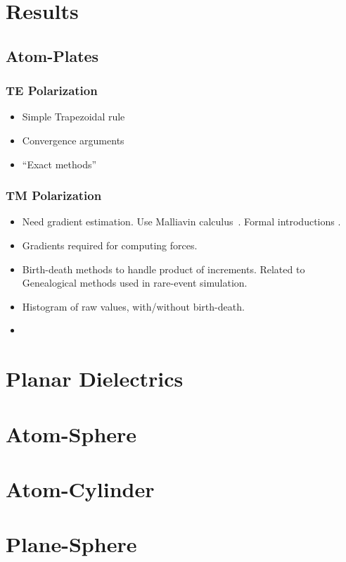 \section{Results}
    \subsection{Atom-Plates}
    
    \subsubsection{TE Polarization}
    \begin{itemize}
      \item Simple Trapezoidal rule
      \item Convergence arguments
      \item ``Exact methods''
    \end{itemize}
    
    \subsubsection{TM Polarization}

    \begin{itemize}
      \item Need gradient estimation.  Use Malliavin calculus~\cite{Fournie1999, Chen2007,Kohatsu-Higa2003}.
        Formal introductions \cite{Nualart2006, Malliavin2006, DiNunno2009}.
      \item Gradients required for computing forces.  
      \item Birth-death methods to handle product of increments.  Related to Genealogical 
        methods used in rare-event simulation.  
      \item Histogram of raw values, with/without birth-death.
      \item 
    \end{itemize}
    
    \section{Planar Dielectrics}




    \section{Atom-Sphere}
    \section{Atom-Cylinder}

    \section{Plane-Sphere}


